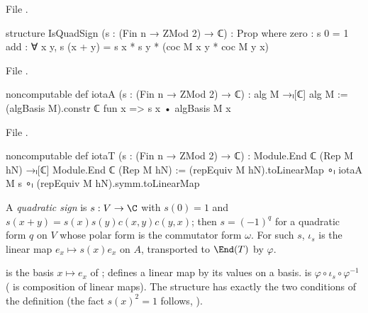 \noindent File .
\begin{leancode}
structure IsQuadSign (s : (Fin n → ZMod 2) → ℂ) : Prop where
  zero : s 0 = 1
  add : ∀ x y, s (x + y) = s x * s y * (coc M x y * coc M y x)
\end{leancode}
\noindent File .
\begin{leancode}
noncomputable def iotaA (s : (Fin n → ZMod 2) → ℂ) : alg M →ₗ[ℂ] alg M :=
  (algBasis M).constr ℂ fun x => s x • algBasis M x
\end{leancode}
\noindent File .
\begin{leancode}
noncomputable def iotaT (s : (Fin n → ZMod 2) → ℂ) :
    Module.End ℂ (Rep M hN) →ₗ[ℂ] Module.End ℂ (Rep M hN) :=
  (repEquiv M hN).toLinearMap ∘ₗ iotaA M s ∘ₗ (repEquiv M hN).symm.toLinearMap
\end{leancode}
\begin{definition}\label{ch06:def:quadsign}
A \emph{quadratic sign} is $s:V\to\C$ with $s(0)=1$ and $s(x+y)=s(x)s(y)c(x,y)c(y,x)$; then
$s=(-1)^q$ for a quadratic form $q$ on $V$ whose polar form is the commutator form $\omega$.
For such $s$, $\iota_s$ is the linear map $e_x\mapsto s(x)e_x$ on $A$, transported to $\End(T)$ by
$\varphi$.
\end{definition}
\begin{dictionary}
 is the basis $x\mapsto e_x$ of ;  defines a linear
map by its values on a basis.   is $\varphi\circ\iota_s\circ\varphi^{-1}$ ( is
composition of linear maps).  The structure  has exactly the two conditions of the
definition (the fact $s(x)^2=1$ follows, ).
\end{dictionary}

